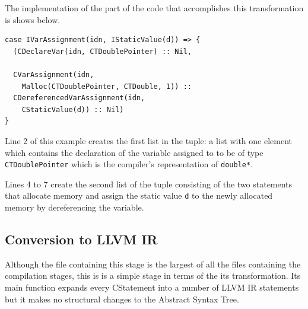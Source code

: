 \documentclass[11pt]{report}
\begin{document}
The implementation of the part of the code that accomplishes this transformation is shows below.

\begin{lstlisting}
case IVarAssignment(idn, IStaticValue(d)) => {
  (CDeclareVar(idn, CTDoublePointer) :: Nil,
  
  CVarAssignment(idn, 
    Malloc(CTDoublePointer, CTDouble, 1)) ::
  CDereferencedVarAssignment(idn, 
    CStaticValue(d)) :: Nil)
}
\end{lstlisting}

Line 2 of this example creates the first list in the tuple: a list with one element which contains the declaration of the variable assigned to to be of type \texttt{CTDoublePointer} which is the compiler's representation of \texttt{double*}.

Lines 4 to 7 create the second list of the tuple consisting of the two statements that allocate memory and assign the static value \texttt{d} to the newly allocated memory by dereferencing the variable.













\subsection{Conversion to LLVM IR}

Although the file containing this stage is the largest of all the files containing the compilation stages, this is is a simple stage in terms of the its transformation. Its main function expands every CStatement into a number of LLVM IR statements but it makes no structural changes to the Abstract Syntax Tree.



\end{document}
